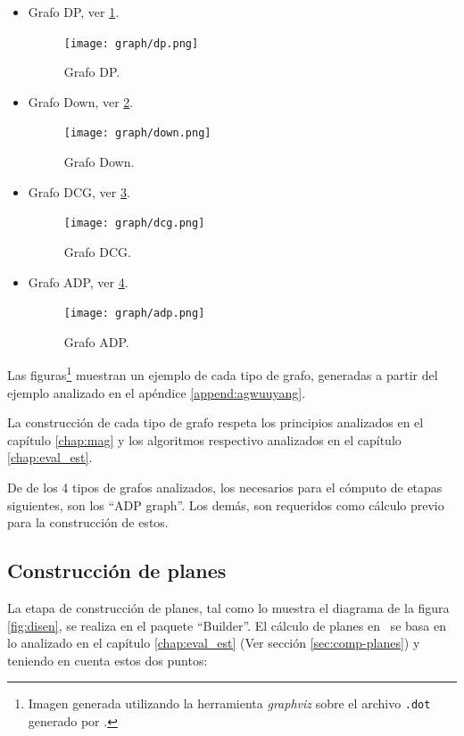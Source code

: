 \begin{itemize}
\item Grafo DP, ver \ref{dpgraph}.
  \begin{figure}[!ht]\centering
    \texttt{[image: graph/dp.png]}
  \caption{\label{dpgraph} Grafo DP.}
  \end{figure}

\item Grafo Down, ver \ref{downgraph}.
  \begin{figure}[!ht]\centering
    \texttt{[image: graph/down.png]}
  \caption{\label{downgraph} Grafo Down.}
  \end{figure}

\item Grafo DCG, ver \ref{dcggraph}.
  \begin{figure}[!ht]\centering
    \texttt{[image: graph/dcg.png]}
  \caption{\label{dcggraph} Grafo DCG.}
  \end{figure}

\item Grafo ADP, ver \ref{adpgraph}.
  \begin{figure}[!ht]\centering
    \texttt{[image: graph/adp.png]}
  \caption{\label{adpgraph} Grafo ADP.}
  \end{figure}
\end{itemize}

Las figuras\footnote{\label{foot:graph} Imagen generada utilizando la herramienta \textit{graphviz} sobre el archivo \texttt{.dot} generado por \maggen.} muestran un ejemplo de cada tipo de grafo, generadas a partir del ejemplo analizado en el apéndice \ref{append:agwuuyang}.

La construcción de cada tipo de grafo respeta los principios analizados en el capítulo \ref{chap:mag} y los algoritmos respectivo analizados en el capítulo  \ref{chap:eval_est}. 

De de los 4 tipos de grafos analizados, los necesarios para el cómputo de etapas siguientes, son los ``ADP graph''. Los demás, son requeridos como cálculo previo para la construcción de estos.

\subsection*{Construcción de planes}
\label{subsec:conts-plan-dise}
La etapa de construcción de planes, tal como lo muestra el diagrama de la figura \ref{fig:disen}, se realiza en el paquete ``Builder''. El cálculo de planes en \maggen\ se basa en lo analizado en el capítulo \ref{chap:eval_est} (Ver sección \ref{sec:comp-planes}) y teniendo en cuenta estos dos puntos:

